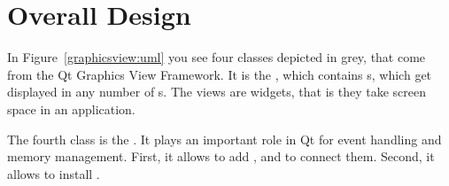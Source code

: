 \section{Overall Design}

In Figure~\ref{graphicsview:uml} you see four classes depicted in grey,
that come from the Qt Graphics View Framework. It is the ,
which contains s, which get displayed in any number
of s. The views are widgets, that is they take screen space
in an application.

The fourth class is the . It plays an important role in Qt for
event handling and memory management. First, it allows to add , and to connect them.  Second, it allows to install .


